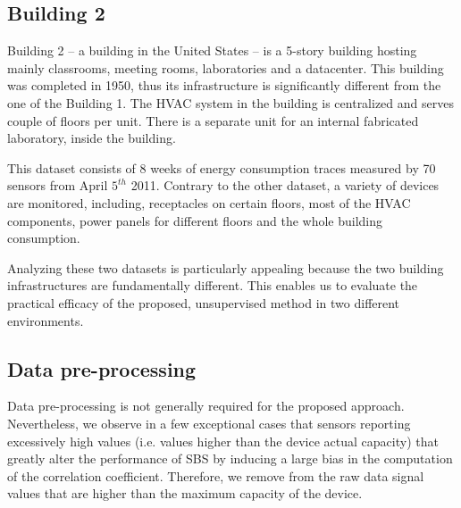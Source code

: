 
\subsection{Building 2}
Building 2 -- a building in the United States -- is a 5-story building hosting mainly classrooms, meeting rooms, laboratories and a datacenter.
This building was completed in 1950, thus its infrastructure is significantly different from the one of the Building 1.
The HVAC system in the building is centralized and serves couple of floors per unit.
There is a separate unit for an internal fabricated laboratory, inside the building.

This dataset consists of 8 weeks of energy consumption traces measured by 70 sensors from April $5^{th}$ 2011.
Contrary to the other dataset, a variety of devices are monitored, including, receptacles on certain floors, most of the HVAC components, 
 power panels for different floors and the whole building consumption.

Analyzing these two datasets is particularly appealing because the two building infrastructures are fundamentally different. 
This enables us to evaluate the practical efficacy of the proposed, unsupervised method in two different environments.


\subsection{Data pre-processing}
Data pre-processing is not generally required for the proposed approach.  
Nevertheless, we observe in a few exceptional cases that sensors reporting excessively high values (i.e. values higher than the device actual capacity) that  greatly alter the performance of SBS by inducing a large bias in the computation of the correlation coefficient.
Therefore, we remove from the raw data signal values that are higher than the maximum capacity of the device.


